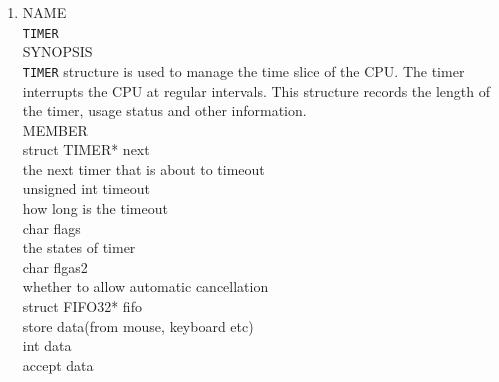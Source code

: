 \documentclass{swfcthesis}
\begin{document}
\begin{enumerate}
  \item
  NAME \\
  \hspace*{1cm}\texttt{TIMER} \\
  SYNOPSIS \\
  \hspace*{1cm} \texttt{TIMER} structure is used to manage the time
slice of the CPU. The timer interrupts the CPU at regular intervals. This structure
records the length of the timer, usage status and other information.\\
  MEMBER \\
  \hspace*{1cm} struct TIMER* next\\
  \hspace*{1.5cm}  the next timer that is about to timeout\\
  \hspace*{1cm} unsigned int timeout\\
  \hspace*{1.5cm} how long is the timeout\\
  \hspace*{1cm} char flags\\
  \hspace*{1.5cm} the states of timer\\
  \hspace*{1cm} char flgas2\\
  \hspace*{1.5cm} whether to allow automatic cancellation\\
  \hspace*{1cm} struct FIFO32* fifo\\
  \hspace*{1.5cm} store data(from mouse, keyboard etc)\\
  \hspace*{1cm} int data\\
  \hspace*{1.5cm}  accept data\\


\end{enumerate}
\end{document}
